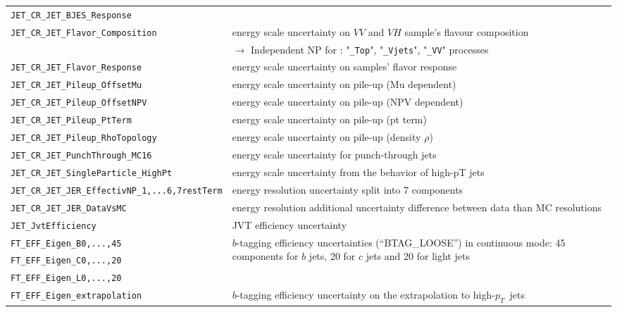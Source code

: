 \begin{table}
{\begin{tabular}{ll}
      \texttt{JET\_CR\_JET\_BJES\_Response} &  \\
      \texttt{JET\_CR\_JET\_Flavor\_Composition} & energy scale uncertainty on $VV$ and $VH$ sample's flavour composition \\
                                         & {$\rightarrow$ Independent NP for : "\texttt{\_Top}", "\texttt{\_Vjets}", "\texttt{\_VV}" processes } \\
      \texttt{JET\_CR\_JET\_Flavor\_Response} & energy scale uncertainty on samples' flavor response \\
      \texttt{JET\_CR\_JET\_Pileup\_OffsetMu} & energy scale uncertainty on pile-up (Mu dependent) \\
      \texttt{JET\_CR\_JET\_Pileup\_OffsetNPV} & energy scale uncertainty on pile-up (NPV dependent) \\
      \texttt{JET\_CR\_JET\_Pileup\_PtTerm} & energy scale uncertainty on pile-up (pt term) \\
      \texttt{JET\_CR\_JET\_Pileup\_RhoTopology} & energy scale uncertainty on pile-up (density $\rho$) \\
      \texttt{JET\_CR\_JET\_PunchThrough\_MC16} & energy scale uncertainty for punch-through jets \\
      \texttt{JET\_CR\_JET\_SingleParticle\_HighPt} & energy scale uncertainty from the behavior of high-pT jets \\
      \texttt{JET\_CR\_JET\_JER\_EffectivNP\_1,...6,7restTerm} & energy resolution uncertainty split into 7 components \\
      \texttt{JET\_CR\_JET\_JER\_DataVsMC} & energy resolution additional uncertainty difference between data than MC resolutions \\
      \texttt{JET\_JvtEfficiency} & JVT efficiency uncertainty \\
      \texttt{FT\_EFF\_Eigen\_B0,...,45} & \multirow{3}{*}{\parbox{11cm}{$b$-tagging efficiency uncertainties (``BTAG\_LOOSE'') in continuous mode: 45 components for $b$ jets, 20 for $c$ jets and 20 for light jets}} \\%
      \texttt{FT\_EFF\_Eigen\_C0,...,20} &\\%
      \texttt{FT\_EFF\_Eigen\_L0,...,20} &\\%
      \texttt{FT\_EFF\_Eigen\_extrapolation} & $b$-tagging efficiency uncertainty on the extrapolation to high-$p_T$\ jets \\%

\end{tabular}}
\end{table}
